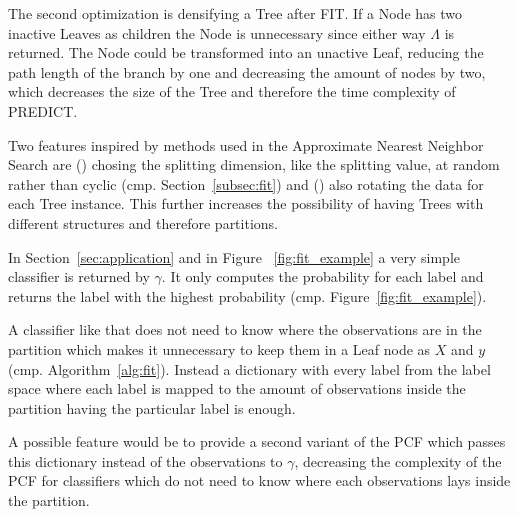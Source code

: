 The second optimization is densifying a Tree after FIT.
If a Node has two inactive Leaves as children the Node is
unnecessary since either way $\Lambda$ is returned. The
Node could be transformed into an unactive Leaf, reducing
the path length of the branch by one and decreasing the
amount of nodes by two, which decreases the size of the
Tree and therefore the time complexity of PREDICT.

Two features inspired by methods used in the Approximate
Nearest Neighbor Search are () chosing the
splitting dimension, like the splitting value, at random
rather than cyclic (cmp. Section~\ref{subsec:fit}) and
() also rotating the data for each Tree
instance.\cite[pages 17 - 27]{anns} This further increases
the possibility of having Trees with different structures
and therefore partitions.\cite[page 24]{anns}

In Section~\ref{sec:application} and in Figure~%
\ref{fig:fit_example} a very simple classifier is returned
by $\gamma$. It only computes the probability for each
label and returns the label with the highest probability
(cmp. Figure~\ref{fig:fit_example}).

A classifier like that does not need to know where the
observations are in the partition which makes it
unnecessary to keep them in a Leaf node as $X$ and $y$
(cmp. Algorithm~\ref{alg:fit}). Instead a dictionary with
every label from the label space where each label is mapped
to the amount of observations inside the partition having
the particular label is enough.

A possible feature would be to provide a second variant of
the PCF which passes this dictionary instead of the
observations to $\gamma$, decreasing the complexity of the
PCF for classifiers which do not need to know where each
observations lays inside the partition.

